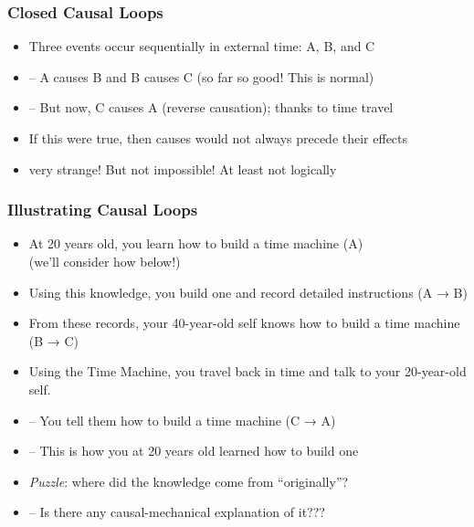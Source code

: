 \begin{frame}
\frametitle{Closed Causal Loops}

\begin{itemize}[<+->]


\item Three events occur sequentially in external time: A, B, and C
\item[] -- A causes B and B causes C (so far so good! This is normal)
\item[] -- But now, C causes A (reverse causation); thanks to time travel
\item If this were true, then causes would not always precede their effects
\item very strange! But not impossible! At least not logically

\end{itemize}
\end{frame}

\begin{frame}
\frametitle{Illustrating Causal Loops}

\begin{itemize}[<+->]

\item At 20 years old, you learn how to build a time machine (A) \\ (we’ll consider how below!)
\item Using this knowledge, you build one and record detailed instructions (A → B)
\item From these records, your 40-year-old self knows how to build a time machine (B → C)
\item Using the Time Machine, you travel back in time and talk to your 20-year-old self. 
\item[] -- You tell them how to build a time machine (C → A)
\item[] -- This is how you at 20 years old learned how to build one %
\item \textit{Puzzle}: where did the knowledge come from ``originally''? 
\item[] -- Is there any causal-mechanical explanation of it??? 

\end{itemize}
\end{frame}

